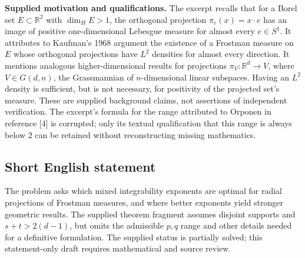 \documentclass[11pt]{article}
\newcommand{\R}{\mathbb{R}}
\begin{document}
\textbf{Supplied motivation and qualifications.} The excerpt recalls that for a Borel set \(E\subset\R^2\) with \(\dim_H E>1\), the orthogonal projection \(\pi_e(x)=x\cdot e\) has an image of positive one-dimensional Lebesgue measure for almost every \(e\in S^1\). It attributes to Kaufman's 1968 argument the existence of a Frostman measure on \(E\) whose orthogonal projections have \(L^2\) densities for almost every direction. It mentions analogous higher-dimensional results for projections \(\pi_V:\R^d\to V\), where \(V\in G(d,n)\), the Grassmannian of \(n\)-dimensional linear subspaces. Having an \(L^2\) density is sufficient, but is not necessary, for positivity of the projected set's measure. These are supplied background claims, not assertions of independent verification. The excerpt's formula for the range attributed to Orponen in reference [4] is corrupted; only its textual qualification that this range is always below \(2\) can be retained without reconstructing missing mathematics.
\subsection{Short English statement}
The problem asks which mixed integrability exponents are optimal for radial projections of Frostman measures, and where better exponents yield stronger geometric results. The supplied theorem fragment assumes disjoint supports and \(s+t>2(d-1)\), but omits the admissible \(p,q\) range and other details needed for a definitive formulation. The supplied status is partially solved; this statement-only draft requires mathematical and source review.
\end{document}
